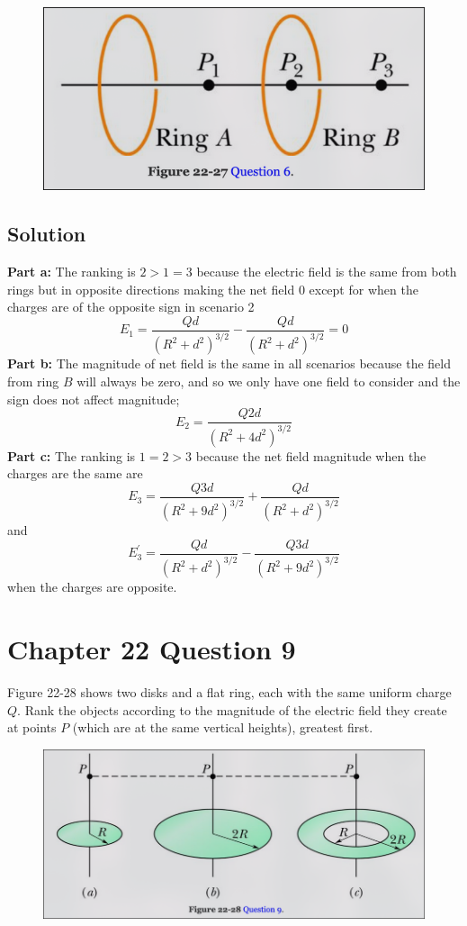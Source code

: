 \documentclass{article}
\begin{document}
\begin{figure}[ht]
    \centering
    \includegraphics[scale=0.4]{image-2.png}
\end{figure}

\subsection*{Solution}
\textbf{Part a:} The ranking is $2 > 1 = 3$ because the electric field is the same from both rings but in opposite directions making the net field 0 except for when the charges are of the opposite sign in scenario 2
\[
	E_1 = \frac{Qd}{\left(R^2 + d^2\right)^{3/2}} - \frac{Qd}{\left(R^2 + d^2\right)^{3/2}} = 0
\]	
\textbf{Part b:} The magnitude of net field is the same in all scenarios because the field from ring $B$ will always be zero, and so we only have one field to consider and the sign does not affect magnitude;
\[
	E_2 = \frac{Q2d}{\left(R^2 + 4d^2\right)^{3/2}}
\]
\textbf{Part c:} The ranking is $1 = 2 > 3$ because the net field magnitude when the charges are the same are
\[
	E_3 = \frac{Q3d}{\left(R^2 + 9d^2\right)^{3/2}} +  \frac{Qd}{\left(R^2 + d^2\right)^{3/2}}
\]
and 
\[
	E_3^\prime = \frac{Qd}{\left(R^2 + d^2\right)^{3/2}} - \frac{Q3d}{\left(R^2 + 9d^2\right)^{3/2}}  
\]
when the charges are opposite.



\section*{Chapter 22 Question 9}
Figure 22-28 shows two disks and a flat ring, each with the same uniform charge $Q$. Rank the objects according to the magnitude of
the electric field they create at points $P$ (which are at the same vertical heights), greatest first.

\begin{figure}[ht]
    \centering
    \includegraphics[scale=0.4]{image-3.png}
\end{figure}
\end{document}
